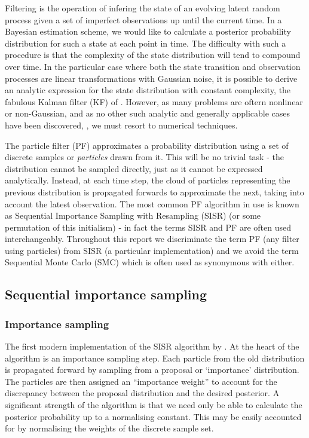 Filtering is the operation of infering the state of an evolving latent random process given a set of imperfect observations up until the current time. In a Bayesian estimation scheme, we would like to calculate a posterior probability distribution for such a state at each point in time. The difficulty with such a procedure is that the complexity of the state distribution will tend to compound over time. In the particular case where both the state transition and observation processes are linear transformations with Gaussian noise, it is possible to derive an analytic expression for the state distribution with constant complexity, the fabulous Kalman filter (KF) of \cite{Kalman1960}. However, as many problems are oftern nonlinear or non-Gaussian, and as no other such analytic and generally applicable cases have been discovered, \cite{Daum2005}, we must resort to numerical techniques.

The particle filter (PF) approximates a probability distribution using a set of discrete samples or \emph{particles} drawn from it. This will be no trivial task - the distribution cannot be sampled directly, just as it cannot be expressed analytically. Instead, at each time step, the cloud of particles representing the previous distribution is propagated forwards to approximate the next, taking into account the latest observation. The most common PF algorithm in use is known as Sequential Importance Sampling with Resampling (SISR) (or some permutation of this initialism) - in fact the terms SISR and PF are often used interchangeably. Throughout this report we discriminate the term PF (any filter using particles) from SISR (a particular implementation) and we avoid the term Sequential Monte Carlo (SMC) which is often used as synonymous with either.

\subsection{Sequential importance sampling}

\subsubsection{Importance sampling}
The first modern implementation of the SISR algorithm by \cite{Gordon1993}. At the heart of the algorithm is an importance sampling step. Each particle from the old distribution is propagated forward by sampling from a proposal or `importance' distribution. The particles are then assigned an ``importance weight'' to account for the discrepancy between the proposal distribution and the desired posterior. A significant strength of the algorithm is that we need only be able to calculate the posterior probability up to a normalising constant. This may be easily accounted for by normalising the weights of the discrete sample set.

